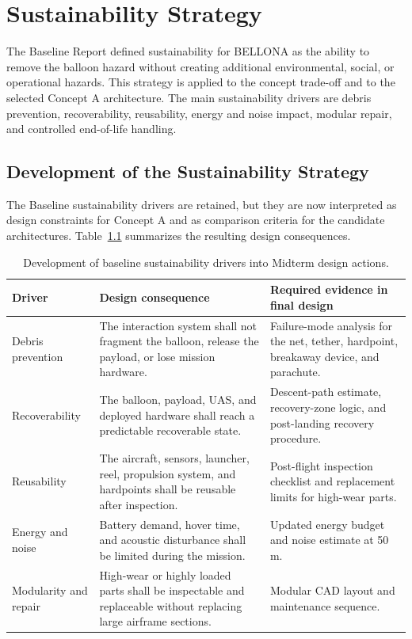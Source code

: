 \chapter{Sustainability Strategy}

The Baseline Report defined sustainability for BELLONA as the ability to remove the balloon hazard without creating additional environmental, social, or operational hazards. This strategy is applied to the concept trade-off and to the selected Concept A architecture. The main sustainability drivers are debris prevention, recoverability, reusability, energy and noise impact, modular repair, and controlled end-of-life handling.

\section{Development of the Sustainability Strategy}

The Baseline sustainability drivers are retained, but they are now interpreted as design constraints for Concept A and as comparison criteria for the candidate architectures. Table~\ref{tab:sustainability_midterm_development} summarizes the resulting design consequences.

\begin{table}[H]
\centering
\footnotesize
\caption{Development of baseline sustainability drivers into Midterm design actions.}
\label{tab:sustainability_midterm_development}
\renewcommand{\arraystretch}{1.2}
\setlength{\tabcolsep}{4pt}
\begin{tabularx}{\textwidth}{@{}p{}X X@{}}
\toprule
\textbf{Driver} & \textbf{Design consequence} & \textbf{Required evidence in final design} \\
\midrule
Debris prevention 
& The interaction system shall not fragment the balloon, release the payload, or lose mission hardware. 
& Failure-mode analysis for the net, tether, hardpoint, breakaway device, and parachute. \\

Recoverability 
& The balloon, payload, UAS, and deployed hardware shall reach a predictable recoverable state. 
& Descent-path estimate, recovery-zone logic, and post-landing recovery procedure. \\

Reusability 
& The aircraft, sensors, launcher, reel, propulsion system, and hardpoints shall be reusable after inspection. 
& Post-flight inspection checklist and replacement limits for high-wear parts. \\

Energy and noise 
& Battery demand, hover time, and acoustic disturbance shall be limited during the mission. 
& Updated energy budget and noise estimate at 50 m. \\

Modularity and repair 
& High-wear or highly loaded parts shall be inspectable and replaceable without replacing large airframe sections. 
& Modular CAD layout and maintenance sequence. \\
\bottomrule
\end{tabularx}
\end{table}

